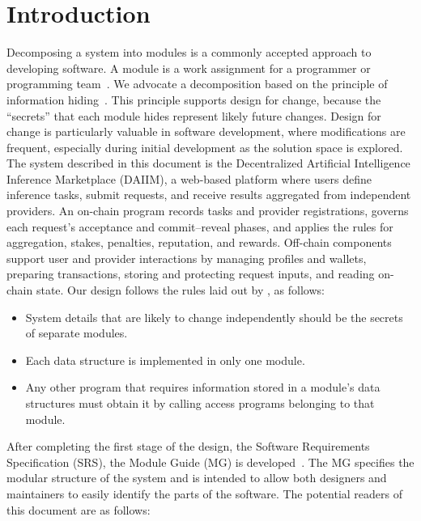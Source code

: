 \documentclass[12pt, titlepage]{article}
\begin{document}
\newpage

\tableofcontents

\listoftables

\listoffigures

\newpage


\section{Introduction}

Decomposing a system into modules is a commonly accepted approach to developing software. A module is a work assignment for a programmer or programming team~\citep{ParnasEtAl1984}. We advocate a decomposition based on the principle of information hiding~\citep{Parnas1972a}. This principle supports design for change, because the ``secrets'' that each module hides represent likely future changes. Design for change is particularly valuable in software development, where modifications are frequent, especially during initial development as the solution space is explored.
The system described in this document is the Decentralized Artificial Intelligence Inference Marketplace (DAIIM), a web-based platform where users define inference tasks, submit requests, and receive results aggregated from independent providers. An on-chain program records tasks and provider registrations, governs each request’s acceptance and commit–reveal phases, and applies the rules for aggregation, stakes, penalties, reputation, and rewards. Off-chain components support user and provider interactions by managing profiles and wallets, preparing transactions, storing and protecting request inputs, and reading on-chain state.
Our design follows the rules laid out by \citet{ParnasEtAl1984}, as follows:
\begin{itemize}
\item System details that are likely to change independently should be the secrets of separate modules.
\item Each data structure is implemented in only one module.
\item Any other program that requires information stored in a module's data structures must obtain it by calling access programs belonging to that module.
\end{itemize}
After completing the first stage of the design, the Software Requirements Specification (SRS), the Module Guide (MG) is developed~\citep{ParnasEtAl1984}. The MG specifies the modular structure of the system and is intended to allow both designers and maintainers to easily identify the parts of the software. The potential readers of this document are as follows:
\end{document}
